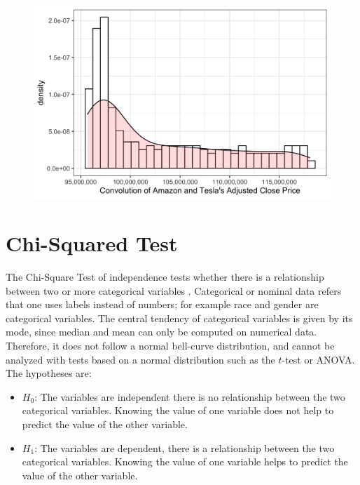 \documentclass[10pt,leter,openany]{article}
\begin{document}
		\begin{figure}
			\begin{center}
				\includegraphics[scale=0.21]{extras/hist_stocks}
				\label{fig:conv1}
			\end{center}
		\end{figure}


\section{Chi-Squared Test}

The Chi-Square Test of independence tests whether there is a relationship between two or more categorical variables  \citep{soetewey2020}.  Categorical or nominal data refers that one uses labels instead of numbers; for example race and gender are categorical variables. The central tendency of categorical variables is given by its mode, since median and mean can only be computed on numerical data. Therefore, it does not follow a normal bell-curve distribution, and cannot be analyzed with tests based on a normal distribution such as the $t$-test or ANOVA. The hypotheses are:
\begin{itemize}
	\item $H_{0}$: The variables are independent there is no relationship between the two categorical variables. Knowing the value of one variable does not help to predict the value of the other variable.
	\item $H_{1}$: The variables are dependent, there is a relationship between the two categorical variables. Knowing the value of one variable helps to predict the value of the other variable.
\end{itemize}
\end{document}
